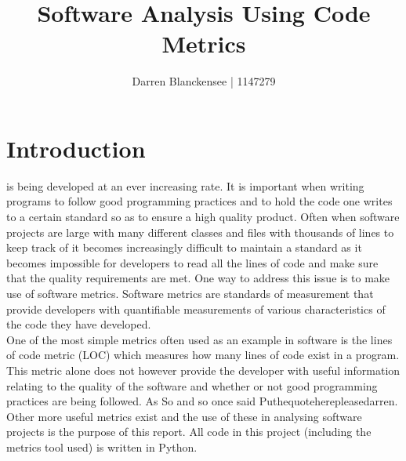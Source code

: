 \documentclass[10.5pt,journal, a4paper]{IEEEtran}
\title{\LARGE {Software  Analysis Using Code Metrics}}
\author{\small {Darren Blanckensee | 1147279}}
\begin{document}
	
	\maketitle


\begin{abstract}

\end{abstract}



\section{Introduction}
\noindent
{} is being developed at an ever increasing rate. It is important when writing programs to follow good programming practices and to hold the code one writes to a certain standard so as to ensure a high quality product. Often when software projects are large with many different classes and files with thousands of lines to keep track of it becomes increasingly difficult to maintain a standard as it becomes impossible for developers to read all the lines of code and make sure that the quality requirements are met. One way to address this issue is to make use of software metrics. Software metrics are standards of measurement that provide developers with quantifiable measurements of various characteristics of the code they have developed. \\

\noindent
One of the most simple metrics often used as an example in software is the lines of code metric (LOC) which measures how many lines of code exist in a program. This metric alone does not however provide the developer with useful information relating to the quality of the software and whether or not good programming practices are being followed. As So and so once said Puthequoteherepleasedarren. Other more useful metrics exist and the use of these in analysing software projects is the purpose of this report. All code in this project (including the metrics tool used) is written in Python.  \\
\end{document}
